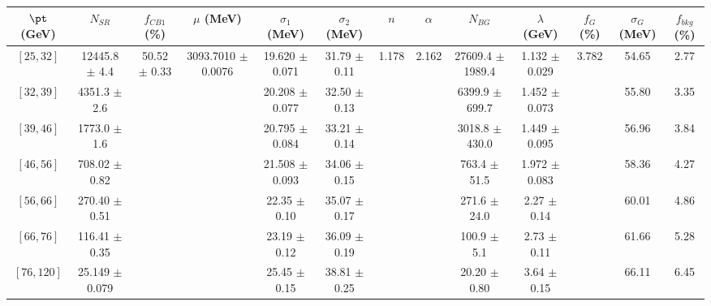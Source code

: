 \begin{tabular}{c||c|c|c|c|c|c|c|c|c|c|c||c}
$\pt$ (GeV) & $N_{SR}$ & $f_{CB1}$ (\%) & $\mu$ (MeV) & $\sigma_1$ (MeV) & $\sigma_2$ (MeV) & $n$ & $\alpha$ & $N_{BG}$ & $\lambda$ (GeV) & $f_G$ (\%) & $\sigma_G$ (MeV) & $f_{bkg}$ (\%) \\
\hline
$[25, 32]$ & 12445.8 $\pm$ 4.4 & \multirow{7}{*}{50.52 $\pm$ 0.33} & \multirow{7}{*}{3093.7010 $\pm$ 0.0076} & 19.620 $\pm$ 0.071 & 31.79 $\pm$ 0.11 & \multirow{7}{*}{1.178} & \multirow{7}{*}{2.162} & 27609.4 $\pm$ 1989.4 & 1.132 $\pm$ 0.029 & \multirow{7}{*}{3.782} & 54.65 & 2.77\\
$[32, 39]$ & 4351.3 $\pm$ 2.6 &  &  & 20.208 $\pm$ 0.077 & 32.50 $\pm$ 0.13 &  &  & 6399.9 $\pm$ 699.7 & 1.452 $\pm$ 0.073 &  & 55.80 & 3.35\\
$[39, 46]$ & 1773.0 $\pm$ 1.6 &  &  & 20.795 $\pm$ 0.084 & 33.21 $\pm$ 0.14 &  &  & 3018.8 $\pm$ 430.0 & 1.449 $\pm$ 0.095 &  & 56.96 & 3.84\\
$[46, 56]$ & 708.02 $\pm$ 0.82 &  &  & 21.508 $\pm$ 0.093 & 34.06 $\pm$ 0.15 &  &  & 763.4 $\pm$ 51.5 & 1.972 $\pm$ 0.083 &  & 58.36 & 4.27\\
$[56, 66]$ & 270.40 $\pm$ 0.51 &  &  & 22.35 $\pm$ 0.10 & 35.07 $\pm$ 0.17 &  &  & 271.6 $\pm$ 24.0 & 2.27 $\pm$ 0.14 &  & 60.01 & 4.86\\
$[66, 76]$ & 116.41 $\pm$ 0.35 &  &  & 23.19 $\pm$ 0.12 & 36.09 $\pm$ 0.19 &  &  & 100.9 $\pm$ 5.1 & 2.73 $\pm$ 0.11 &  & 61.66 & 5.28\\
$[76, 120]$ & 25.149 $\pm$ 0.079 &  &  & 25.45 $\pm$ 0.15 & 38.81 $\pm$ 0.25 &  &  & 20.20 $\pm$ 0.80 & 3.64 $\pm$ 0.15 &  & 66.11 & 6.45\\
\end{tabular}
